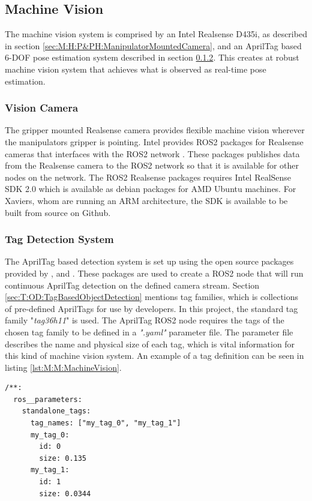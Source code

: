 \subsection{Machine Vision} \label{sec:M:MRC:MachineVision}
The machine vision system is comprised by an Intel Realsense D435i, as described in section \ref{sec:M:H:P&PH:ManipulatorMountedCamera}, and an AprilTag based 6-DOF pose estimation system described in section \ref{sec:M:MRC:MV:TagDetectionSystem}. This creates at robust machine vision system that achieves what is observed as real-time pose estimation.

\subsubsection{Vision Camera} 
The gripper mounted Realsense camera provides flexible machine vision wherever the manipulators gripper is pointing. Intel provides ROS2 packages for Realsense cameras that interfaces with the ROS2 network \cite{realsense_ros_repo}. These packages publishes data from the Realsense camera to the ROS2 network so that it is available for other nodes on the network. The ROS2 Realsense packages requires Intel RealSense SDK 2.0 which is available as debian packages for AMD Ubuntu machines. For Xaviers, whom are running an ARM architecture, the SDK is available to be built from source on Github\cite{realsense_jetson_guide}.

\subsubsection{Tag Detection System} \label{sec:M:MRC:MV:TagDetectionSystem}
The AprilTag based detection system is set up using the open source packages provided by \cite{apriltag_repo}, \cite{apriltag_ros_repo} and \cite{apriltag_msgs_repo}. These packages are used to create a ROS2 node that will run continuous AprilTag detection on the defined camera stream. Section \ref{sec:T:OD:TagBasedObjectDetection} mentions tag families, which is collections of pre-defined AprilTags for use by developers. In this project, the standard tag family "\textit{tag36h11}" is used. The AprilTag ROS2 node requires the tags of the chosen tag family to be defined in a \textit{".yaml"} parameter file. The parameter file describes the name and physical size of each tag, which is vital information for this kind of machine vision system. An example of a tag definition can be seen in listing \ref{lst:M:M:MachineVision}.

\begin{lstlisting}[language=XML, label=lst:M:M:MachineVision, caption={Example of AprilTag tag definitions in a ".yaml" file. This example defines two tags of different names, using the tag id 0 and 1 in the defined tag family The size is alse defined for each tag. The tag family (tag36h11) is set in another parameter file.}]
/**:
  ros__parameters:
    standalone_tags:
      tag_names: ["my_tag_0", "my_tag_1"]
      my_tag_0:
        id: 0
        size: 0.135
      my_tag_1:
        id: 1
        size: 0.0344
\end{lstlisting}

